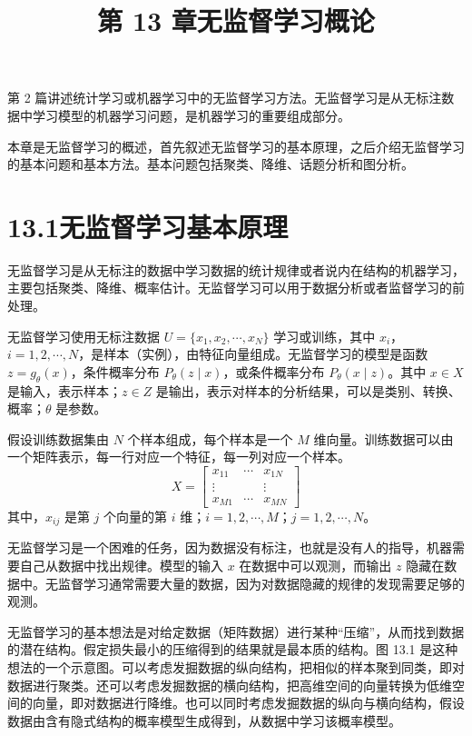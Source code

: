 \documentclass[UTF8, 12pt, fontset=fandol, oneside]{ctexart}
\title{第 13 章\quad 无监督学习概论}
\author{}
\date{}
\begin{document}
\maketitle

第 2 篇讲述统计学习或机器学习中的无监督学习方法。无监督学习是从无标注数据中学习模型的机器学习问题，是机器学习的重要组成部分。

本章是无监督学习的概述，首先叙述无监督学习的基本原理，之后介绍无监督学习的基本问题和基本方法。基本问题包括聚类、降维、话题分析和图分析。

\section*{13.1\quad 无监督学习基本原理}

无监督学习是从无标注的数据中学习数据的统计规律或者说内在结构的机器学习，主要包括聚类、降维、概率估计。无监督学习可以用于数据分析或者监督学习的前处理。

无监督学习使用无标注数据 $U=\{x_1,x_2,\cdots,x_N\}$ 学习或训练，其中 $x_i$，$i=1,2,\cdots,N$，是样本（实例），由特征向量组成。无监督学习的模型是函数 $z=g_\theta(x)$，条件概率分布 $P_\theta(z\mid x)$，或条件概率分布 $P_\theta(x\mid z)$。其中 $x\in X$ 是输入，表示样本；$z\in Z$ 是输出，表示对样本的分析结果，可以是类别、转换、概率；$\theta$ 是参数。

假设训练数据集由 $N$ 个样本组成，每个样本是一个 $M$ 维向量。训练数据可以由一个矩阵表示，每一行对应一个特征，每一列对应一个样本。
\[
X=
\begin{bmatrix}
x_{11} & \cdots & x_{1N}\\
\vdots & & \vdots\\
x_{M1} & \cdots & x_{MN}
\end{bmatrix}
\]
其中，$x_{ij}$ 是第 $j$ 个向量的第 $i$ 维；$i=1,2,\cdots,M$；$j=1,2,\cdots,N$。

无监督学习是一个困难的任务，因为数据没有标注，也就是没有人的指导，机器需要自己从数据中找出规律。模型的输入 $x$ 在数据中可以观测，而输出 $z$ 隐藏在数据中。无监督学习通常需要大量的数据，因为对数据隐藏的规律的发现需要足够的观测。

无监督学习的基本想法是对给定数据（矩阵数据）进行某种“压缩”，从而找到数据的潜在结构。假定损失最小的压缩得到的结果就是最本质的结构。图 13.1 是这种想法的一个示意图。可以考虑发掘数据的纵向结构，把相似的样本聚到同类，即对数据进行聚类。还可以考虑发掘数据的横向结构，把高维空间的向量转换为低维空间的向量，即对数据进行降维。也可以同时考虑发掘数据的纵向与横向结构，假设数据由含有隐式结构的概率模型生成得到，从数据中学习该概率模型。
\end{document}
